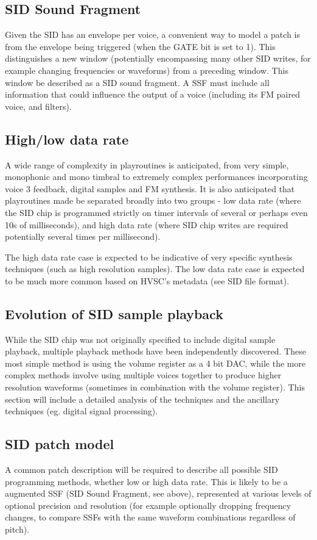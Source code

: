 \documentclass[10pt]{article}
\begin{document}
\begin{multicols*}{2}
  \subsection{SID Sound Fragment}
  Given the SID has an envelope per voice, a convenient way to model
  a patch is from the envelope being triggered (when the GATE bit
  is set to 1). This distinguishes a new window (potentially encompassing
  many other SID writes, for example changing frequencies or
  waveforms) from a preceding window. This window be described
  as a SID sound fragment. A SSF must include all information
  that could influence the output of a voice (including its
  FM paired voice, and filters).

  \subsection{High/low data rate}
  A wide range of complexity in playroutines is anticipated, from
  very simple, monophonic and mono timbral to extremely
  complex performances incorporating voice 3 feedback, digital
  samples and FM synthesis. It is also anticipated that playroutines
  made be separated broadly into two groups - low data rate (where
  the SID chip is programmed strictly on timer intervals of
  several or perhaps even 10s of milliseconds), and high data rate
  (where SID chip writes are required potentially several times
  per millisecond).

  The high data rate case is expected to be indicative of very
  specific synthesis techniques (such as high resolution samples).
  The low data rate case is expected to be much more common based
  on HVSC's metadata (see SID file format).

    \subsection{Evolution of SID sample playback}
  While the SID chip was not originally specified to include digital
  sample playback, multiple playback methods have been independently
  discovered. These most simple method is using the volume register
  as a 4 bit DAC, while the more complex methods involve using
  multiple voices together to produce higher resolution waveforms
  (sometimes in combination with the volume register). This
  section will include a detailed analysis of the techniques and
  the ancillary techniques (eg. digital signal processing).

  \subsection{SID patch model}
  A common patch description will be required to describe all possible
  SID programming methods, whether low or high data rate. This is
  likely to be a augmented SSF (SID Sound Fragment, see above),
  represented at various levels of optional precision and resolution
  (for example optionally dropping frequency changes, to compare SSFs
  with the same waveform combinations regardless of pitch).


\end{multicols*}
\end{document}
